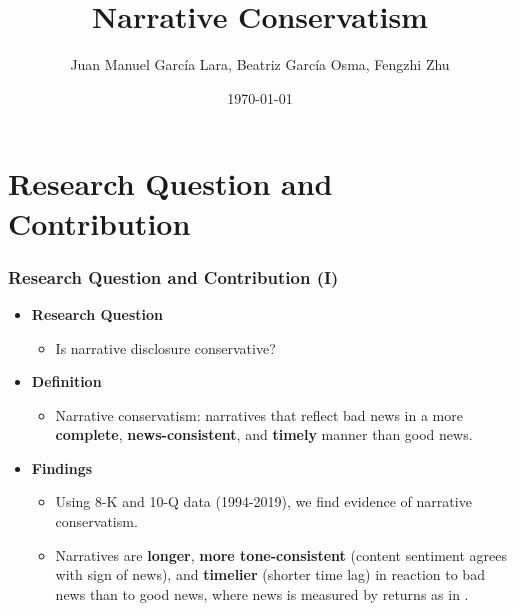 \documentclass{beamer}
\title[Narrative Conservatism]{Narrative Conservatism} %
\author[]{Juan Manuel Garc\'ia Lara, Beatriz Garc\'ia Osma, Fengzhi Zhu} %
\institute[EAA-VARS] %
{\textit{\textit{Universidad Carlos III de Madrid}} \\ %

	\bigskip
	
\medskip
\large EAA-VARS

} %
\date{\today} %
\begin{document}
	
\begin{frame}
\titlepage %
\end{frame}


\section{Research Question and Contribution}

\begin{frame}
\frametitle{Research Question and Contribution (I)}
\begin{itemize}
\item \textbf{Research Question}

\begin{itemize}
\item Is narrative disclosure conservative?

\end{itemize}

\medskip
\pause

\item \textbf{Definition}
\begin{itemize}
	\item Narrative conservatism: narratives that reflect bad news in a more \textbf{complete}, \textbf{news-consistent}, and \textbf{timely} manner than good news.
\end{itemize}

\medskip
\pause

\item \textbf{Findings}
\begin{itemize}
\item Using 8-K and 10-Q data (1994-2019), we find evidence of narrative conservatism. 
\item Narratives are \textbf{longer}, \textbf{more tone-consistent} (content sentiment agrees with sign of news), and \textbf{timelier} (shorter time lag) in reaction to bad news than to good news, where news is measured by returns as in \citet{basuConservatismPrincipleAsymmetric1997}.

\end{itemize}






\end{itemize}
\end{frame}
\end{document}
